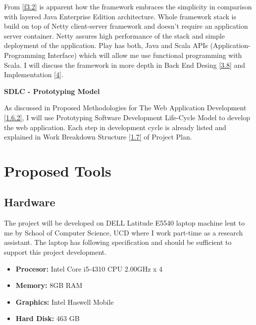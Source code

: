 \documentclass[12pt,twoside,a4paper]{report}
\begin{document}
From \cref{f3.2} is apparent how the framework embraces the simplicity in comparison with layered Java Enterprise Edition architecture. Whole framework stack is build on top of Netty\cite{19} client-server framework and doesn't require an application server container. Netty assures high performance of the stack and simple deployment of the application. Play has both, Java and Scala APIs (Application-Programming Interface) which will allow me use functional programming with Scala. I will discuss the framework in more depth in Back End Desing \cref{3.8} and Implementation \cref{4}.\par
\textbf{SDLC - Prototyping Model}\par
As discussed in Proposed Methodologies for The Web Application Development \cref{1.6.2}, I will use Prototyping Software Development Life-Cycle Model to develop the web application. Each step in development cycle is already listed and explained in Work Breakdown Structure \cref{1.7} of Project Plan.

\section{Proposed Tools}\label{3.3}

\subsection{Hardware}\label{3.3.1}
The project will be developed on DELL Latitude E5540 laptop machine lent to me by School of Computer Science, UCD where I work part-time as a research assistant. The laptop has following specification and should be sufficient to support this project development.
\begin{itemize}\itemsep1pt \parskip0pt 
\item \textbf{Procesor:} Intel Core i5-4310 CPU 2.00GHz x 4
\item \textbf{Memory:} 8GB RAM
\item \textbf{Graphics:} Intel Haswell Mobile
\item \textbf{Hard Disk:} 463 GB
\end{itemize}
\end{document}
